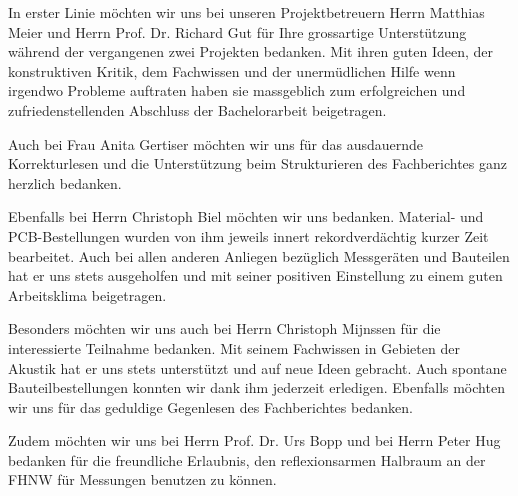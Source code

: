 In erster Linie möchten wir uns bei unseren Projektbetreuern Herrn Matthias Meier und Herrn Prof. Dr. Richard Gut für Ihre grossartige Unterstützung während der vergangenen zwei Projekten bedanken. Mit ihren guten Ideen, der konstruktiven Kritik, dem Fachwissen und der unermüdlichen Hilfe wenn irgendwo Probleme auftraten haben sie massgeblich zum erfolgreichen und zufriedenstellenden Abschluss der Bachelorarbeit beigetragen.

Auch bei Frau Anita Gertiser möchten wir uns für das ausdauernde Korrekturlesen und die Unterstützung beim Strukturieren des Fachberichtes ganz herzlich bedanken.

Ebenfalls bei Herrn Christoph Biel möchten wir uns bedanken. Material- und PCB-Bestellungen wurden von ihm jeweils innert rekordverdächtig kurzer Zeit bearbeitet. Auch bei allen anderen Anliegen bezüglich Messgeräten und Bauteilen hat er uns stets ausgeholfen und mit seiner positiven Einstellung zu einem guten Arbeitsklima beigetragen.

Besonders möchten wir uns auch bei Herrn Christoph Mijnssen für die interessierte Teilnahme bedanken. Mit seinem Fachwissen in Gebieten der Akustik hat er uns stets unterstützt und auf neue Ideen gebracht. Auch spontane Bauteilbestellungen konnten wir dank ihm jederzeit erledigen. Ebenfalls möchten wir uns für das geduldige Gegenlesen des Fachberichtes bedanken.

Zudem möchten wir uns bei Herrn Prof. Dr. Urs Bopp und bei Herrn Peter Hug bedanken für die freundliche Erlaubnis, den reflexionsarmen Halbraum an der FHNW für Messungen benutzen zu können.
